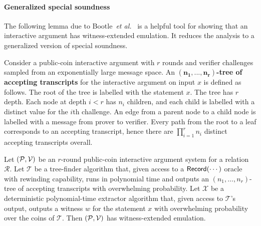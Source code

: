 \paragraph{Generalized special soundness} The following lemma due to Bootle~\emph{et al.}~\cite{EC:BCCGP16} is a helpful tool for showing that an interactive argument has witness-extended emulation. It reduces the analysis to a generalized version of special soundness. 

Consider a public-coin interactive argument with $r$ rounds and verifier challenges sampled from an exponentially large message space. An \textbf{$\mathbf{(n_1,...,n_r)}$-tree of accepting transcripts} for the interactive argument on input $x$ is defined as follows. The root of the tree is labelled with the statement $x$. The tree has $r$ depth. Each node at depth $i < r$ has $n_i$ children, and each child is labelled with a distinct value for the $i$th challenge. An edge from a parent node to a child node is labelled with a message from prover to verifier. Every path from the root to a leaf corresponds to an accepting transcript, hence there are $\prod_{i=1}^r n_i$ distinct accepting transcripts overall. 

\begin{lemma} \label{lemma:GFL}
Let $(\mathcal{P}, \mathcal{V})$ be an $r$-round public-coin interactive argument system for a relation $\mathcal{R}$. Let $\mathcal{T}$ be a tree-finder algorithm that, given access to a $\textsf{{Record}}(\cdots)$ oracle with rewinding capability, runs in polynomial time and outputs an $({n_1}, \ldots, {n_r})$-tree of accepting transcripts with overwhelming probability. Let $\mathcal{X}$ be a deterministic polynomial-time extractor algorithm that, given access to $\mathcal{T}$'s output, outputs a witness $w$ for the statement $x$ with overwhelming probability over the coins of $\mathcal{T}$. Then $(\mathcal{P}, \mathcal{V})$ has witness-extended emulation.
\end{lemma}

